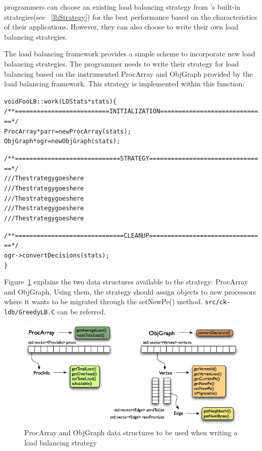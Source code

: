 \charmpp{} programmers can choose an existing load balancing strategy from
\charmpp{}'s built-in strategies(see ~\ref{lbStrategy}) for the best performance
based on the characteristics of their applications. However, they can also
choose to write their own load balancing strategies.

The \charmpp{} load balancing framework provides a simple scheme to incorporate
new load balancing strategies. The programmer needs to write their strategy for
load balancing based on the instrumented ProcArray and ObjGraph provided by the
load balancing framework. This strategy is implemented within this
function:

\begin{alltt}
void FooLB::work(LDStats *stats) \{
  /** ========================== INITIALIZATION ============================= */
  ProcArray *parr = new ProcArray(stats);
  ObjGraph *ogr = new ObjGraph(stats);

  /** ============================= STRATEGY ================================ */
  /// The strategy goes here
  /// The strategy goes here
  /// The strategy goes here
  /// The strategy goes here
  /// The strategy goes here

  /** ============================== CLEANUP ================================ */
  ogr->convertDecisions(stats);
\}
\end{alltt}

Figure~\ref{fig:ckgraph} explains the two data structures available to the
strategy: ProcArray and ObjGraph. Using them, the strategy should assign objects 
to new processors  where it wants to be migrated through the setNewPe() method.
{\tt src/ck-ldb/GreedyLB.C} can be referred.
\begin{figure}[h]
\centering
\includegraphics[width=6.0in]{fig/ckgraph.png}
\caption{ProcArray and ObjGraph data structures to be used when writing a load
balancing strategy}
\label{fig:ckgraph}
\end{figure}

